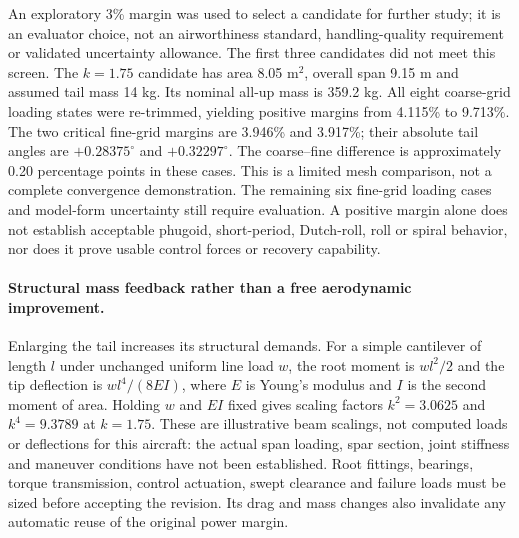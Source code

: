 \documentclass[11pt,a4paper]{article}
\begin{document}
An exploratory 3\% margin was used to select a candidate for further study;
it is an evaluator choice, not an airworthiness standard, handling-quality
requirement or validated uncertainty allowance. The first three candidates
did not meet this screen. The $k=1.75$ candidate has area 8.05 m$^2$, overall
span 9.15 m and assumed tail mass 14 kg. Its nominal all-up mass is 359.2 kg.
All eight coarse-grid loading states were re-trimmed, yielding positive
margins from 4.115\% to 9.713\%. The two critical fine-grid margins are
3.946\% and 3.917\%; their absolute tail angles are $+0.28375^\circ$ and
$+0.32297^\circ$. The coarse--fine difference is approximately 0.20 percentage
points in these cases. This is a limited mesh comparison, not a complete
convergence demonstration. The remaining six fine-grid loading cases and
model-form uncertainty still require evaluation. A positive margin alone
does not establish acceptable phugoid, short-period, Dutch-roll, roll or spiral
behavior, nor does it prove usable control forces or recovery capability.

\paragraph{Structural mass feedback rather than a free aerodynamic improvement.}
Enlarging the tail increases its structural demands. For a simple cantilever
of length $l$ under unchanged uniform line load $w$, the root moment is
$wl^2/2$ and the tip deflection is $wl^4/(8EI)$, where $E$ is Young's modulus
and $I$ is the second moment of area. Holding $w$ and $EI$ fixed gives scaling
factors $k^2=3.0625$ and $k^4=9.3789$ at $k=1.75$. These are illustrative
beam scalings, not computed loads or deflections for this aircraft: the actual
span loading, spar section, joint stiffness and maneuver conditions have not
been established. Root fittings, bearings, torque transmission, control
actuation, swept clearance and failure loads must be sized before accepting
the revision. Its drag and mass changes also invalidate any automatic reuse
of the original power margin.
\end{document}
